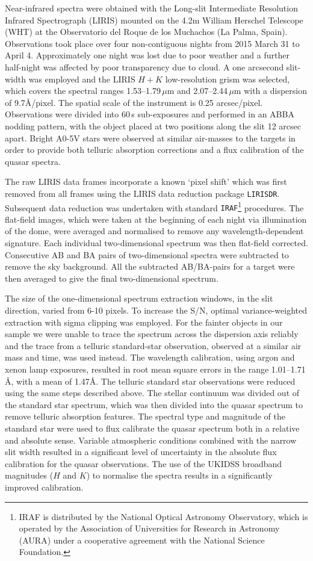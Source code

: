 Near-infrared spectra were obtained with the Long-slit Intermediate Resolution Infrared Spectrograph (LIRIS) mounted on the 4.2m William Herschel Telescope (WHT) at the Observatorio del Roque de los Muchachos (La Palma, Spain). 
Observations took place over four non-contiguous nights from 2015 March 31 to April 4. 
Approximately one night was lost due to poor weather and a further half-night was affected by poor transparency due to cloud. 
A one arcsecond slit-width was employed and the LIRIS $H+K$ low-resolution grism was selected, which covers the spectral ranges 1.53--1.79\,$\mu$m and 2.07--2.44\,$\mu$m with a dispersion of 9.7\AA/pixel. 
The spatial scale of the instrument is 0.25 arcsec/pixel. 
Observations were divided into 60\,s sub-exposures and performed in an ABBA nodding pattern, with the object placed at two positions along the slit 12 arcsec apart. 
Bright A0-5V stars were observed at similar air-masses to the targets in order to provide both telluric absorption corrections and a flux calibration of the quasar spectra.

The raw LIRIS data frames incorporate a known `pixel shift' which was first removed from all frames using the LIRIS data reduction package {\tt LIRISDR}. 
Subsequent data reduction was undertaken with standard {\tt IRAF}\footnote{IRAF is distributed by the National Optical Astronomy Observatory, which is operated by the Association of Universities for Research in Astronomy (AURA) under a cooperative agreement with the National Science Foundation.} procedures.  
The flat-field images, which were taken at the beginning of each night via illumination of the dome, were averaged and normalised to remove any wavelength-dependent signature. 
Each individual two-dimensional spectrum was then flat-field corrected. 
Consecutive AB and BA pairs of two-dimensional spectra were subtracted to remove the sky background. 
All the subtracted AB/BA-pairs for a target were then averaged to give the final two-dimensional spectrum.

The size of the one-dimensional spectrum extraction windows, in the slit direction, varied from 6-10 pixels. 
To increase the S/N, optimal variance-weighted extraction with sigma clipping was employed. 
For the fainter objects in our sample we were unable to trace the spectrum across the dispersion axis reliably and the trace from a telluric standard-star observation, observed at a similar air mass and time, was used instead. 
The wavelength calibration, using argon and xenon lamp exposures, resulted in root mean square errors in the range 1.01--1.71\,\AA, with a mean of 1.47\AA. 
The telluric standard star observations were reduced using the same steps described above. 
The stellar continuum was divided out of the standard star spectrum, which was then divided into the quasar spectrum to remove telluric absorption features. 
The spectral type and magnitude of the standard star were used to flux calibrate the quasar spectrum both in a relative and absolute sense.
Variable atmospheric conditions combined with the narrow slit width resulted in a significant level of uncertainty in the absolute flux calibration for the quasar observations. 
The use of the UKIDSS broadband magnitudes ($H$ and $K$) to normalise the spectra results in a significantly improved calibration. 


